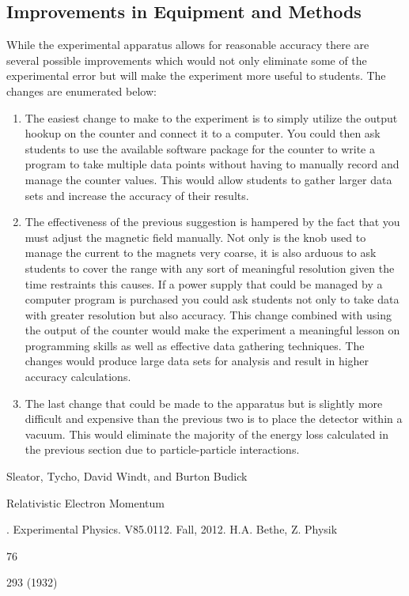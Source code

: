 \subsection{Improvements in Equipment and Methods}
While the experimental apparatus allows for reasonable accuracy there are several possible improvements which would not only eliminate some of the experimental error but will make the experiment more useful to students.  The changes are enumerated below:
\begin{enumerate}
\item The easiest change to make to the experiment is to simply utilize the output hookup on the counter and connect it to a computer. You could then ask students to use the available software package for the counter to write a program to take multiple data points without having to manually record and manage the counter values.  This would allow students to gather larger data sets and increase the accuracy of their results. 
\item The effectiveness of the previous suggestion is hampered by the fact that you must adjust the magnetic field manually.  Not only is the knob used to manage the current to the magnets very coarse, it is also arduous to ask students to cover the range with any sort of meaningful resolution given the time restraints this causes.  If a power supply that could be managed by a computer program is purchased you could ask students not only to take data with greater resolution but also accuracy. This change combined with using the output of the counter would make the experiment a meaningful lesson on programming skills as well as effective data gathering techniques. The changes would produce large data sets for analysis and result in higher accuracy calculations.  
\item The last change that could be made to the apparatus but is slightly more difficult and expensive than the previous two is to place the detector within a vacuum. This would eliminate the majority of the energy loss calculated in the previous section due to particle-particle interactions.  
\end{enumerate} 


\begin{thebibliography}{99}
Sleator, Tycho, David Windt, and Burton Budick \begin{em}Relativistic Electron Momentum\end{em}. Experimental Physics. V85.0112. Fall, 2012.
 H.A. Bethe, Z. Physik \begin{em} 76 \end{em} 293 (1932)
\end{thebibliography}

